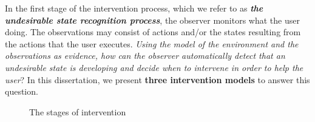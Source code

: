 In the first stage of the intervention process, which we refer to as \textit{\textbf{the undesirable state recognition process}}, the observer monitors what the user doing.
The observations may consist of actions and/or the states resulting from the actions that the user executes. 
\textit{Using the model of the environment and the observations as evidence, how can the observer automatically detect that an undesirable state is developing and decide when to intervene in order to help the user}? In this dissertation, we present \textbf{three intervention models} to answer this question.
\begin{figure}[ptb]
   \caption{The stages of intervention}
\label{fig:stages}
\end{figure}

